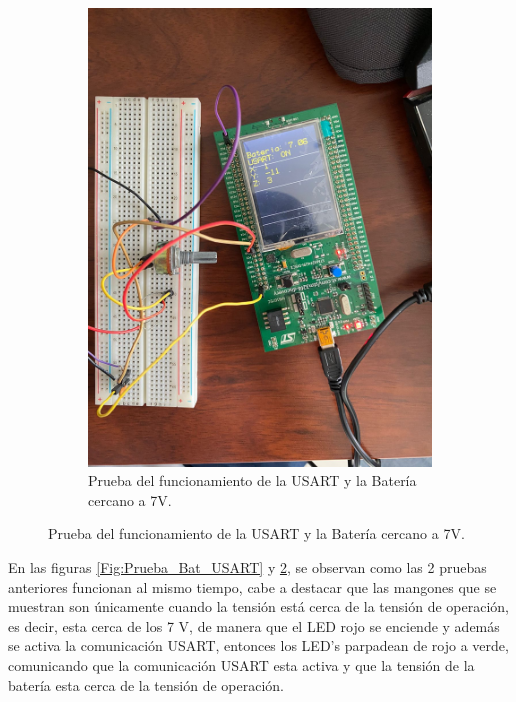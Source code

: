 \begin{figure}[H]
\begin{subfigure}{0.5\textwidth}
    \includegraphics[width=\textwidth]{Imagenes/Prueba_Bat_USART2.jpg} 
    \caption{Prueba del funcionamiento de la USART y la Batería cercano a 7V.}
    \label{Fig:Prueba_Bat_USART2}
\end{subfigure}
\end{figure}

En las figuras \ref{Fig:Prueba_Bat_USART} y \ref{Fig:Prueba_Bat_USART2}, se observan como las 2 pruebas anteriores funcionan al mismo tiempo, cabe a destacar que las mangones que se muestran son únicamente cuando la tensión está cerca de la tensión de operación, es decir, esta cerca de los 7 V, de manera que el LED rojo se enciende y además se activa la comunicación USART, entonces los LED's parpadean de rojo a verde, comunicando que la comunicación USART esta activa y que la tensión de la batería esta cerca de la tensión de operación.



